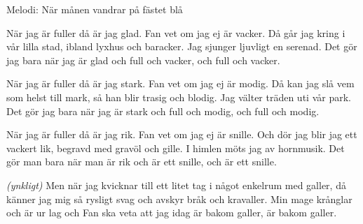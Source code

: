 \begin{song}

\begin{songmeta}
Melodi: När månen vandrar på fästet blå
\end{songmeta}

\begin{songtext}
När jag är fuller då är jag glad.
Fan vet om jag ej är vacker.
Då går jag kring i vår lilla stad,
ibland lyxhus och baracker.
Jag sjunger ljuvligt en serenad.
Det gör jag bara när jag är glad
och full och vacker, och full och vacker.

När jag är fuller då är jag stark.
Fan vet om jag ej är modig.
Då kan jag slå vem som helst till mark,
så han blir trasig och blodig.
Jag välter träden uti vår park.
Det gör jag bara när jag är stark
och full och modig, och full och modig.

När jag är fuller då är jag rik.
Fan vet om jag ej är snille.
Och dör jag blir jag ett vackert lik,
begravd med gravöl och gille.
I himlen möts jag av hornmusik.
Det gör man bara när man är rik
och är ett snille, och är ett snille.

\textit{(ynkligt)}
Men när jag kvicknar till ett litet tag
i något enkelrum med galler,
då känner jag mig så rysligt svag
och avskyr bråk och kravaller.
Min mage krånglar och är ur lag
och Fan ska veta att jag idag
är bakom galler, är bakom galler.

\end{songtext}
\end{song}
